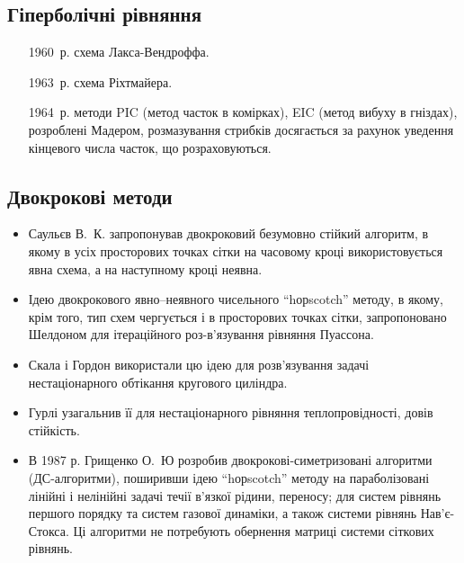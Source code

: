 \subsection{Гіперболічні рівняння}

\begin{itemize}
    \item[1960~р.] схема Лакса-Вендроффа.
    \item[1963~р.] схема Ріхтмайера.
    \item[1964~р.] методи PIC (метод часток в комірках), EIC (метод вибуху в гніздах), розроблені  Мадером, розмазування стрибків досягається за рахунок уведення кінцевого числа часток, що розраховуються. 
\end{itemize}

\subsection{Двокрокові методи}

\begin{itemize}
    \item Саульєв В.~К. запропонував двокроковий безумовно стійкий алгоритм, в якому в усіх просторових точках сітки на часовому кроці використовується явна схема, а на наступному кроці неявна. 
    \item Ідею двокрокового явно–неявного чисельного ``hорscotch'' методу, в якому, крім того, тип схем чергується і в просторових точках сітки, запропоновано Шелдоном для ітераційного роз-в'язування рівняння Пуассона. 
    \item Скала і Гордон  використали цю ідею для розв'язування задачі нестаціонарного обтікання кругового циліндра.
    \item Гурлі узагальнив її для нестаціонарного рівняння теплопровідності, довів стійкість. 
    \item В 1987 р. Грищенко О.~Ю розробив двокрокові-симетризовані алгоритми (ДС-алгоритми), поширивши ідею ``hорscotch'' методу на параболізовані лінійні і нелінійні задачі течії в'язкої рідини, переносу; для систем рівнянь першого порядку та систем газової динаміки, а також системи рівнянь Нав'є-Стокса. Ці алгоритми не потребують обернення матриці системи сіткових рівнянь.
\end{itemize}


